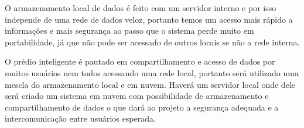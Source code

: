 O armazenamento local de dados é feito com um servidor interno e por isso independe de uma rede de dados veloz, portanto temos um acesso mais rápido a informações e mais segurança ao passo que o sistema perde muito em portabilidade, já que não pode ser acessado de outros locais se não a rede interna.

O prédio inteligente é pautado em compartilhamento e acesso de dados por muitos usuários nem todos acessando uma rede local, portanto será utilizado uma mescla do armazenamento local e em nuvem. Haverá um servidor local onde dele será criado um sistema em nuvem com possibilidade de armazenamento e compartilhamento de dados o que dará ao projeto a segurança adequada e a intercomunicação entre usuários esperada.

